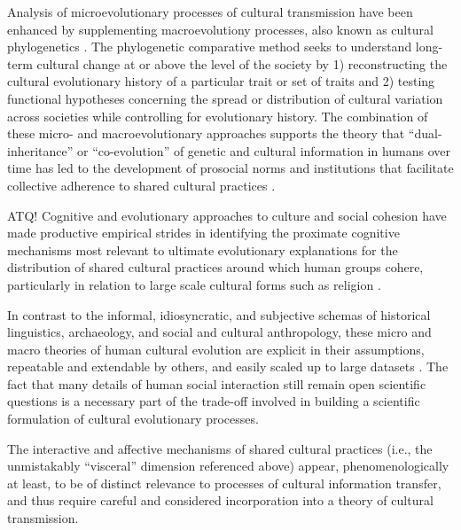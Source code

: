 Analysis of microevolutionary processes of cultural transmission have been enhanced by supplementing macroevolutiony processes, also known as cultural phylogenetics \citep{Mace1994}.  The phylogenetic comparative method seeks to understand long-term cultural change at or above the level of the society by 1) reconstructing the cultural evolutionary history of a particular trait or set of traits and 2) testing functional hypotheses concerning the spread or distribution of cultural variation across societies while controlling for evolutionary history.  The combination of these micro- and macroevolutionary approaches supports the theory that  ``dual-inheritance'' or ``co-evolution'' of genetic and cultural information in humans over time has led to the development of prosocial norms and institutions that facilitate collective adherence to shared cultural practices \citep{Richerson2008,Chudek2011}.


ATQ!
Cognitive and evolutionary approaches to culture and social cohesion have made productive empirical strides in identifying the proximate cognitive mechanisms most relevant to ultimate evolutionary explanations for the distribution of shared cultural practices around which human groups cohere, particularly in relation to large scale cultural forms such as religion \citep{Henrich2015,Purzycki2016b}.

 In contrast to the informal, idiosyncratic, and subjective schemas of historical linguistics, archaeology, and social and cultural anthropology, these micro and macro theories of human cultural evolution are explicit in their assumptions, repeatable and extendable by others, and easily scaled up to large datasets \citep{Mesoudi2017}. The fact that many details of human social interaction still remain open scientific questions is a necessary part of the trade-off involved in building a scientific formulation of cultural evolutionary processes.


The interactive and affective mechanisms of shared cultural practices (i.e., the unmistakably ``visceral'' dimension referenced above) appear, phenomenologically at least, to be of distinct relevance to processes of cultural information transfer, and thus require careful and considered incorporation into a theory of cultural transmission.


